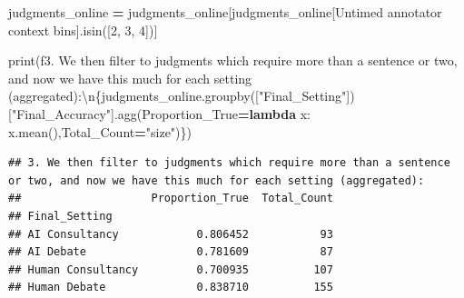 \documentclass[
]{article}
\newenvironment{Shaded}{\begin{snugshade}}{\end{snugshade}}
\newcommand{\BuiltInTok}[1]{#1}
\newcommand{\CharTok}[1]{\textcolor[rgb]{0.31,0.60,0.02}{#1}}
\newcommand{\KeywordTok}[1]{\textcolor[rgb]{0.13,0.29,0.53}{\textbf{#1}}}
\newcommand{\NormalTok}[1]{#1}
\newcommand{\OperatorTok}[1]{\textcolor[rgb]{0.81,0.36,0.00}{\textbf{#1}}}
\newcommand{\SpecialCharTok}[1]{\textcolor[rgb]{0.00,0.00,0.00}{#1}}
\newcommand{\SpecialStringTok}[1]{\textcolor[rgb]{0.31,0.60,0.02}{#1}}
\newcommand{\StringTok}[1]{\textcolor[rgb]{0.31,0.60,0.02}{#1}}
\begin{document}
\begin{Shaded}
\begin{Highlighting}[]
\NormalTok{judgments\_online }\OperatorTok{=}\NormalTok{ judgments\_online[judgments\_online[}\StringTok{\textquotesingle{}Untimed annotator context bins\textquotesingle{}}\NormalTok{].isin([}\StringTok{\textquotesingle{}2\textquotesingle{}}\NormalTok{, }\StringTok{\textquotesingle{}3\textquotesingle{}}\NormalTok{, }\StringTok{\textquotesingle{}4\textquotesingle{}}\NormalTok{])]}

\BuiltInTok{print}\NormalTok{(}\SpecialStringTok{f\textquotesingle{}3. We then filter to judgments which require more than a sentence or two, and now we have this much for each setting (aggregated):}\CharTok{\textbackslash{}n}\SpecialCharTok{\{}\NormalTok{judgments\_online}\SpecialCharTok{.}\NormalTok{groupby([}\StringTok{"Final\_Setting"}\NormalTok{])[}\StringTok{"Final\_Accuracy"}\NormalTok{]}\SpecialCharTok{.}\NormalTok{agg(Proportion\_True}\OperatorTok{=}\KeywordTok{lambda}\NormalTok{ x: x.mean(),Total\_Count}\OperatorTok{=}\StringTok{"size"}\NormalTok{)}\SpecialCharTok{\}}\SpecialStringTok{\textquotesingle{}}\NormalTok{)}
\end{Highlighting}
\end{Shaded}

\begin{verbatim}
## 3. We then filter to judgments which require more than a sentence or two, and now we have this much for each setting (aggregated):
##                    Proportion_True  Total_Count
## Final_Setting                                  
## AI Consultancy            0.806452           93
## AI Debate                 0.781609           87
## Human Consultancy         0.700935          107
## Human Debate              0.838710          155
\end{verbatim}
\end{document}
